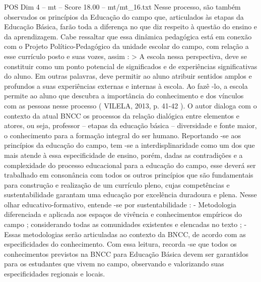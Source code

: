 \begin{textsample}{POS Dim 4 – mt – Score 18.00 – mt/mt\_16.txt}
Nesse processo, são também observados os princípios da Educação do campo que, articulados às etapas da Educação Básica, farão toda a diferença no que diz respeito à questão do ensino e da aprendizagem.
Cabe ressaltar que essa dinâmica pedagógica está em conexão com o Projeto Político-Pedagógico da unidade escolar do campo, com relação a esse currículo posto e suas vozes, assim : > A escola nessa perspectiva, deve se constituir como um ponto potencial de significados e de experiências significativas do aluno.
Em outras palavras, deve permitir ao aluno atribuir sentidos amplos e profundos a suas experiências externas e internas à escola.
Ao fazê -lo, a escola permite ao aluno que descubra a importância do conhecimento e dos vínculos com as pessoas nesse processo ( VILELA, 2013, p. 41-42 ).
O autor dialoga com o contexto da atual BNCC os processos da relação dialógica entre elementos e atores, ou seja, professor – etapas da educação básica – diversidade e fonte maior, o conhecimento para a formação integral do ser humano.
Reportando -se aos princípios da educação do campo, tem -se a interdisplinaridade como um dos que mais atende à essa especificidade de ensino, porém, dadas as contradições e a complexidade do processo educacional para a educação do campo, esse deverá ser trabalhado em consonância com todos os outros princípios que são fundamentais para construção e realização de um currículo pleno, cujas competências e sustentabilidade garantam uma educação por excelência duradoura e plena.
Nesse olhar educativo-formativo, entende -se por sustentabilidade : - Metodologia diferenciada e aplicada aos espaços de vivência e conhecimentos empíricos do campo ; considerando todas as comunidades existentes e elencadas no texto ; - Essas metodologias serão articuladas ao contexto da BNCC, de acordo com as especificidades do conhecimento.
Com essa leitura, recorda -se que todos os conhecimentos previstos na BNCC para Educação Básica devem ser garantidos para os estudantes que vivem no campo, observando e valorizando suas especificidades regionais e locais.

\end{textsample}
